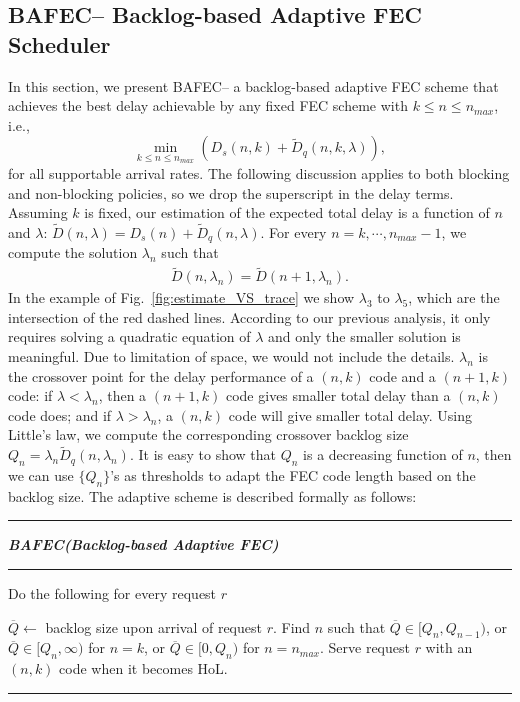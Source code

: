 \documentclass[journal]{IEEEtran}
\newcommand{\nonBlocking}{{BAFEC}\xspace}
\begin{document}
\subsection{\nonBlocking -- Backlog-based Adaptive FEC Scheduler }
In this section, we present \nonBlocking -- a backlog-based adaptive FEC scheme that achieves the best delay achievable by any fixed FEC scheme with $k\le n\le n_{max}$, i.e.,
\begin{equation*}
\min_{k\le n\le n_{max}}\left( D_s(n,k) + \tilde{D}_q(n,k,\lambda)\right),
\end{equation*}
for all supportable arrival rates. The following discussion applies to both blocking and non-blocking policies, so we drop the superscript in the delay terms.  
Assuming $k$ is fixed, our estimation of the expected total delay  is a function of  $n$ and $\lambda$: $\tilde{D}(n,\lambda) = D_s(n) + \tilde{D}_q(n,\lambda)$. For every $n = k,\cdots, n_{max}-1$, we compute the solution $\lambda_n$ such that
\begin{align}
\tilde{D}(n,\lambda_n) = \tilde{D}(n+1,\lambda_n).
\label{eq:threshold}
\end{align}
In the example of Fig.~\ref{fig:estimate_VS_trace} we show $\lambda_3$ to $\lambda_5$, which are the intersection of the red dashed lines.
According to our previous analysis, it only requires solving a quadratic equation of $\lambda$ and only the smaller solution is meaningful. Due to limitation of space, we would not include the details.   
$\lambda_n$ is the crossover point for the delay performance of a $(n,k)$ code and a $(n+1,k)$ code: if $\lambda < \lambda_n$, then a $(n+1,k)$ code gives smaller total delay than a $(n,k)$ code does; and if $\lambda > \lambda_n$, a $(n,k)$ code will give smaller total delay.  Using Little's law, we compute the corresponding crossover backlog size $Q_n = \lambda_n \tilde{D}_q(n,\lambda_n)$. It is easy to show that $Q_n$ is a decreasing function of $n$, then we can use $\{Q_n\}$'s as thresholds to adapt the FEC code length based on the backlog size. The adaptive scheme is described formally as follows:

\vspace{5pt}
\hrule
\vspace{2pt}
\noindent \textit{\textbf{\nonBlocking (Backlog-based Adaptive FEC)}}
\hrule
\vspace{2pt}


\noindent Do the following for every request $r$

\begin{algorithmic} [1]

\STATE $\overline{Q} \leftarrow $ backlog size upon arrival of request $r$.
\STATE Find $n$ such that $\overline{Q}\in [Q_{n}, Q_{n-1})$, or $\overline{Q}\in [Q_{n},\infty)$ for $n=k$, or $\overline{Q}\in [0,Q_{n})$ for $n=n_{max}$.
\STATE Serve request $r$ with an $(n,k)$ code when it becomes HoL.
\end{algorithmic}
\hrule
\end{document}
